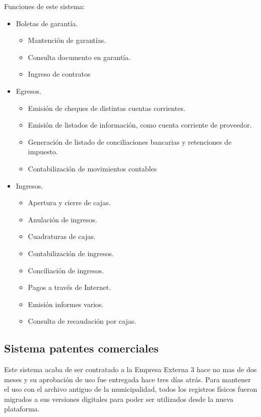 Funciones de este sistema:
\begin{itemize}
    \item{ Boletas  de garantía. 
        \begin{itemize}
        \item Mantención  de garantías.
        \item Consulta  documento  en garantía.
        \item Ingreso de contratos
        \end{itemize}
    }
\end{itemize}

\begin{itemize}
    \item{ Egresos. 
        \begin{itemize}
        \item Emisión  de cheques  de distintas  cuentas  corrientes.
        \item Emisión   de  listados   de  información,   como   cuenta   corriente   de proveedor.
        \item Generación  de listado  de conciliaciones   bancarias  y retenciones  de impuesto.
        \item Contabilización  de movimientos  contables
    \end{itemize}
}
\end{itemize}
\begin{itemize}
    \item{ Ingresos. 
        \begin{itemize}
        \item Apertura  y cierre de cajas.
        \item Anulación  de ingresos.
        \item Cuadraturas  de cajas.
        \item Contabilización  de ingresos.
        \item Conciliación  de ingresos.
        \item Pagos a través de Internet.
        \item Emisión  informes  varios.
        \item Consulta  de recaudación  por cajas.
    \end{itemize}
}
\end{itemize}
    

\subsection{Sistema patentes comerciales}
Este sistema acaba de ser contratado a la Empresa Externa 3 hace no mas de dos meses y su aprobación de uso fue entregada hace tres días atrás. Para mantener el uso con el archivo antiguo de la municipalidad, todos los registros físicos fueron migrados a sus versiones digitales para poder ser utilizados desde la nueva plataforma.

